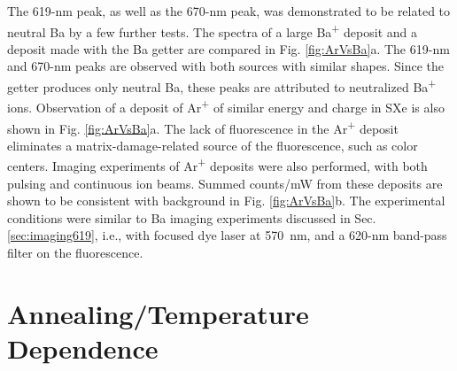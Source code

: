 The 619-nm peak, as well as the 670-nm peak, was demonstrated to be related to neutral Ba by a few further tests.  The spectra of a large Ba\textsuperscript{+} deposit and a deposit made with the Ba getter are compared in Fig. \ref{fig:ArVsBa}a.  The 619-nm and 670-nm peaks are observed with both sources with similar shapes.  Since the getter produces only neutral Ba, these peaks are attributed to neutralized Ba\textsuperscript{+} ions.  Observation of a deposit of Ar\textsuperscript{+} of similar energy and charge in SXe is also shown in Fig. \ref{fig:ArVsBa}a.  The lack of fluorescence in the Ar\textsuperscript{+} deposit eliminates a matrix-damage-related source of the fluorescence, such as color centers.  Imaging experiments of Ar\textsuperscript{+} deposits were also performed, with both pulsing and continuous ion beams.  Summed counts/mW from these deposits are shown to be consistent with background in Fig. \ref{fig:ArVsBa}b.  The experimental conditions were similar to Ba imaging experiments discussed in Sec. \ref{sec:imaging619}, i.e., with focused dye laser at 570~nm, and a 620-nm band-pass filter on the fluorescence.




\section{Annealing/Temperature Dependence}
\label{sec:tempanneal}



